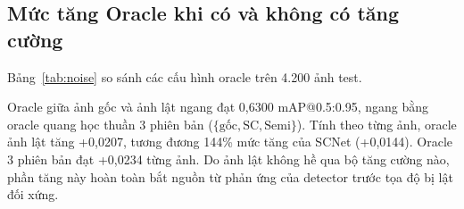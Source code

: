 \documentclass[runningheads]{llncs}
\begin{document}
\subsection{Mức tăng Oracle khi có và không có tăng cường}
\label{sec:res-noise}

Bảng~\ref{tab:noise} so sánh các cấu hình oracle trên 4.200 ảnh test.

\begin{table}[t]
    \centering
    \caption{So sánh Oracle giữa bộ tăng cường quang học và ảnh lật ngang trên tập test RUOD.}
    \label{tab:noise}
\end{table}

Oracle giữa ảnh gốc và ảnh lật ngang đạt 0,6300 mAP@0.5:0.95, ngang bằng oracle quang học thuần 3 phiên bản ($\{\text{gốc}, \text{SC}, \text{Semi}\}$). Tính theo từng ảnh, oracle ảnh lật tăng +0,0207, tương đương 144\% mức tăng của SCNet (+0,0144). Oracle 3 phiên bản đạt +0,0234 từng ảnh. Do ảnh lật không hề qua bộ tăng cường nào, phần tăng này hoàn toàn bắt nguồn từ phản ứng của detector trước tọa độ bị lật đối xứng.
\end{document}

